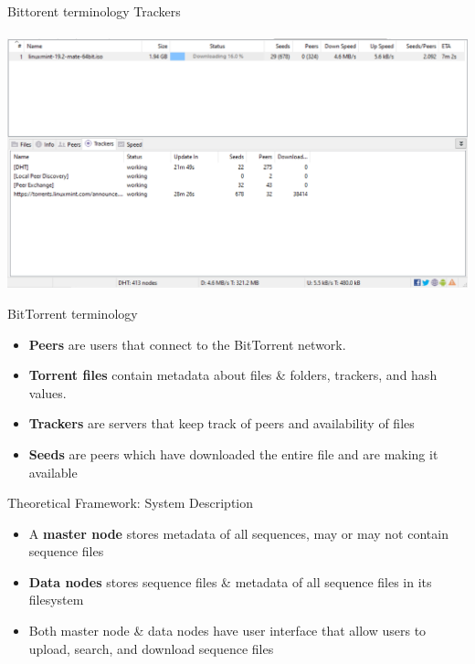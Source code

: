 \documentclass{beamer}
\begin{document}
        \begin{frame}{Bittorent terminology}
            Trackers \\ \\
             \centering
            \includegraphics[scale=0.5]{bit-3.PNG}
        \end{frame}
        
        \begin{frame}{BitTorrent terminology}
            \begin{itemize} %
                \item \textbf{Peers} are users that connect to the BitTorrent network.
                \item \textbf{Torrent files} contain metadata about files \& folders, trackers, and hash values.
                \item \textbf{Trackers} are servers that keep track of peers and availability of files
                \item \textbf{Seeds} are peers which have downloaded the entire file and are making it available
            \end{itemize}
        \end{frame}




\begin{frame}{Theoretical Framework: System Description}
    \begin{itemize}
        \item A \textbf{master node} stores metadata of all sequences, may or may not contain sequence files
        \item \textbf{Data nodes} stores sequence files \& metadata of all sequence files in its filesystem
        \item Both master node \& data nodes have user interface that allow users to upload, search, and download sequence files
    \end{itemize}
\end{frame}
\end{document}
